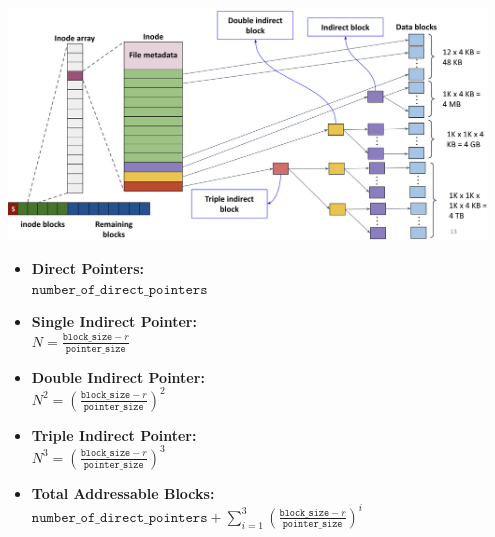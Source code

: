\documentclass[8pt]{extarticle}
\begin{document}
\begin{minipage}[htp]{0.5\textwidth}
\begin{center}
    \includegraphics[width=0.95\textwidth]{images/multi-level-indexing.png}
\end{center}
\vspace*{-10px}
\begin{minipage}[htp]{0.4\textwidth}
    \small
\begin{itemize}[noitemsep,nolistsep,topsep=0px,partopsep=0pt,parsep=0pt]
    \item[] \textbf{Direct Pointers:} \\ 
$
    \texttt{number\_of\_direct\_pointers}
$
    
    \item[] \textbf{Single Indirect Pointer:} \\ 
$
    N = \frac{\texttt{block\_size} - r}{\texttt{pointer\_size}}
$
    
    \item[] \textbf{Double Indirect Pointer:} \\ 
$
    N^2 = \left(\frac{\texttt{block\_size} - r}{\texttt{pointer\_size}}\right)^2
$
\item[] \textbf{Triple Indirect Pointer:}  \\
$
    N^3 = \left(\frac{\texttt{block\_size} - r}{\texttt{pointer\_size}}\right)^3
$
\end{itemize}
\end{minipage}
\hspace*{-20px}
\begin{minipage}[htp]{0.68\textwidth}
    \small
\begin{itemize}[noitemsep,nolistsep,topsep=0px,partopsep=0pt,parsep=0pt]

    
    \item[] \textbf{Total Addressable Blocks:} \\ 
    \small
    $
    \texttt{number\_of\_direct\_pointers} + \sum_{i=1}^{3} \left(\frac{\texttt{block\_size} - r}{\texttt{pointer\_size}}\right)^i
$


\end{itemize}
\end{minipage}
\end{minipage}
\end{document}
